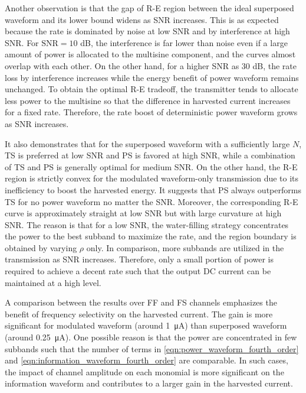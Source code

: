 Another observation is that the gap of R-E region between the ideal superposed waveform and its lower bound widens as SNR increases. This is as expected because the rate is dominated by noise at low SNR and by interference at high SNR. For ${\text{SNR}} = 10$ dB, the interference is far lower than noise even if a large amount of power is allocated to the multisine component, and the curves almost overlap with each other. On the other hand, for a higher SNR as 30 dB, the rate loss by interference increases while the energy benefit of power waveform remains unchanged. To obtain the optimal R-E tradeoff, the transmitter tends to allocate less power to the multisine so that the difference in harvested current increases for a fixed rate. Therefore, the rate boost of deterministic power waveform grows as SNR increases.

It also demonstrates that for the superposed waveform with a sufficiently large $N$, TS is preferred at low SNR and PS is favored at high SNR, while a combination of TS and PS is generally optimal for medium SNR. On the other hand, the R-E region is strictly convex for the modulated waveform-only transmission due to its inefficiency to boost the harvested energy. It suggests that PS always outperforms TS for no power waveform no matter the SNR. Moreover, the corresponding R-E curve is approximately straight at low SNR but with large curvature at high SNR. The reason is that for a low SNR, the water-filling strategy concentrates the power to the best subband to maximize the rate, and the region boundary is obtained by varying $\rho $ only. In comparison, more subbands are utilized in the transmission as SNR increases. Therefore, only a small portion of power is required to achieve a decent rate such that the output DC current can be maintained at a high level.

A comparison between the results over FF and FS channels emphasizes the benefit of frequency selectivity on the harvested current. The gain is more significant for modulated waveform (around \SI{1}{\uA}) than superposed waveform (around \SI{0.25}{\uA}). One possible reason is that the power are concentrated in few subbands such that the number of terms in \ref{eqn:power_waveform_fourth_order} and \ref{eqn:information_waveform_fourth_order} are comparable. In such cases, the impact of channel amplitude on each monomial is more significant on the information waveform and contributes to a larger gain in the harvested current. 

